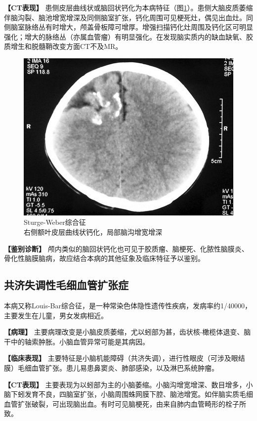 \textbf{【CT表现】}
患侧皮层曲线状或脑回状钙化为本病特征（图\ref{fig2-12}）。患侧大脑皮质萎缩伴脑沟裂、脑池增宽增深及同侧脑室扩张，钙化周围可见梗死灶，偶见出血灶。同侧脑室脉络丛有时增大，颅盖骨板障可增厚。增强扫描钙化灶周围及钙化区可明显强化；增大的脉络丛（亦属血管瘤）有明显强化。在发现脑实质内的缺血缺氧、胶质增生和脱髓鞘改变方面CT不及MR。

\begin{figure}[!htbp]
 \centering
 \includegraphics[width=.7\textwidth,height=\textheight,keepaspectratio]{./images/Image00028.jpg}
 \captionsetup{justification=centering}
 \caption{Sturge-Weber综合征\\{\small 右侧额叶皮层曲线状钙化，局部脑沟增宽增深}}
 \label{fig2-12}
  \end{figure} 



\textbf{【鉴别诊断】}
颅内类似的脑回状钙化也可见于胶质瘤、脑梗死、化脓性脑膜炎、骨化性脑膜脑病，故应结合本病的其他征象及临床特征予以鉴别。

\subsection{共济失调性毛细血管扩张症}

本病又称Louis-Bar综合征，是一种常染色体隐性遗传性疾病，发病率约1/40000，主要发生在儿童，男女发病相近。

\textbf{【病理】}
主要病理改变是小脑皮质萎缩，尤以蚓部为甚，齿状核-橄榄体退变、脑干中的轴索肿胀。小脑血管异常可能是其病因。

\textbf{【临床表现】}
主要特征是小脑机能障碍（共济失调），进行性眼皮（可涉及眼结膜）毛细血管扩张。患儿易患鼻窦炎、肺部感染，以及淋巴系统肿瘤。

\textbf{【CT表现】}
主要表现为以蚓部为主的小脑萎缩。小脑沟增宽增深、数目增多，小脑下蚓发育不良，四脑室扩张，小脑周围蛛网膜下腔、脑池增宽。如伴脑实质毛细血管扩张破裂，可出现脑出血。有时可见脑梗死，由来自肺内血管畸形的栓子所致。

